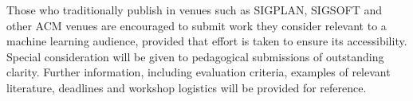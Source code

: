 \documentclass{article}
\begin{document}
    Those who traditionally publish in venues such as SIGPLAN, SIGSOFT and other ACM venues are encouraged to submit work they consider relevant to a machine learning audience, provided that effort is taken to ensure its accessibility. Special consideration will be given to pedagogical submissions of outstanding clarity. Further information, including evaluation criteria, examples of relevant literature, deadlines and workshop logistics will be provided for reference.


    \begin{figure}[H]
\end{figure}
\end{document}
